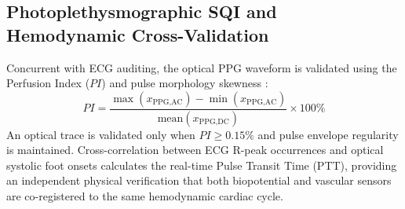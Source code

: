 \subsection{Photoplethysmographic SQI and Hemodynamic Cross-Validation}
Concurrent with ECG auditing, the optical PPG waveform is validated using the Perfusion Index ($PI$) and pulse morphology skewness \cite{Elgendi2016}:
\begin{equation}
    PI = \frac{\max(x_{\text{PPG,AC}}) - \min(x_{\text{PPG,AC}})}{\text{mean}(x_{\text{PPG,DC}})} \times 100\%
\end{equation}
An optical trace is validated only when $PI \ge 0.15\%$ and pulse envelope regularity is maintained. Cross-correlation between ECG R-peak occurrences and optical systolic foot onsets calculates the real-time Pulse Transit Time (PTT), providing an independent physical verification that both biopotential and vascular sensors are co-registered to the same hemodynamic cardiac cycle.
